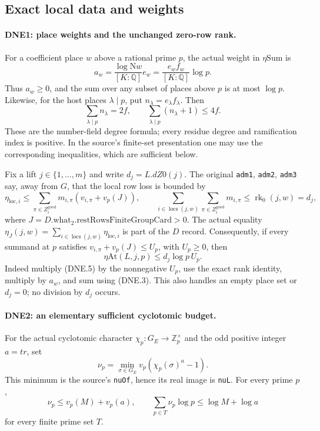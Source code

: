 \documentclass[11pt,a4paper]{article}
\numberwithin{equation}{section}
\theoremstyle{remark}\newtheorem{remark}[theorem]{Remark}
\begin{document}
\subsection{Exact local data and weights}

\paragraph{DNE1: place weights and the unchanged zero-row rank.}
\label{claim:DNE1}
For a coefficient place $w$ above a rational prime $p$, the actual
weight in $\eta\mathrm{Sum}$ is
\[
 a_w=\frac{\log \mathrm Nw}{[K:\mathbb Q]}e_w
     =\frac{e_w f_w}{[K:\mathbb Q]}\log p.                 \tag{DNE.3}
\]
Thus $a_w\ge0$, and the sum over any subset of places above $p$
is at most $\log p$.  Likewise, for the host places $\lambda\mid p$,
put $n_\lambda=e_\lambda f_\lambda$.  Then
\[
 \sum_{\lambda\mid p}n_\lambda=2f,\qquad
 \sum_{\lambda\mid p}(n_\lambda+1)\le4f.                 \tag{DNE.4}
\]
These are the number-field degree formula; every residue degree
and ramification index is positive.  In the source's finite-set
presentation one may use the corresponding inequalities, which
are sufficient below.

Fix a lift $j\in\{1,\ldots,m\}$ and write $d_j=L.dZ0(j)$.
The original \texttt{adm1}, \texttt{adm2}, \texttt{adm3} say,
away from $G$, that the local row loss is bounded by
\[
 \eta_{\mathrm{loc},i}\le
    \sum_{\pi\in Z_i^{\mathrm{good}}}
         m_{i,\pi}(v_{i,\pi}+v_p(J)),\qquad
 \sum_{i\in\operatorname{locs}(j,w)}
    \sum_{\pi\in Z_i^{\mathrm{good}}}m_{i,\pi}
 \le \operatorname{rk}_0(j,w)=d_j,                       \tag{DNE.5}
\]
where $J=D.\mathrm{what}_2.\mathrm{restRowsFiniteGroupCard}>0$.
The actual equality
$\eta_J(j,w)=\sum_{i\in\operatorname{locs}(j,w)}\eta_{\mathrm{loc},i}$
is part of the $D$ record.  Consequently, if every summand at $p$
satisfies $v_{i,\pi}+v_p(J)\le U_p$, with $U_p\ge0$, then
\[
 \eta\mathrm{At}(L,j,p)\le d_j\log p\,U_p.              \tag{DNE.6}
\]
Indeed multiply (DNE.5) by the nonnegative $U_p$, use the exact rank
identity, multiply by $a_w$, and sum using (DNE.3).  This also
handles an empty place set or $d_j=0$; no division by $d_j$ occurs.

\paragraph{DNE2: an elementary sufficient cyclotomic budget.}
\label{claim:DNE2}
For the actual cyclotomic character $\chi_p:G_E\to\mathbb Z_p^\times$
and the odd positive integer $a=tr$, set
\[
 \nu_p=\min_{\sigma\in G_E}v_p(\chi_p(\sigma)^a-1).
\]
This minimum is the source's \texttt{nu\allowbreak Of}, hence its real image is
\texttt{nu\allowbreak L}.  For every prime $p$,
\[
 \nu_p\le v_p(M)+v_p(a),\qquad
 \sum_{p\in T}\nu_p\log p\le\log M+\log a              \tag{DNE.7}
\]
for every finite prime set $T$.
\end{document}
